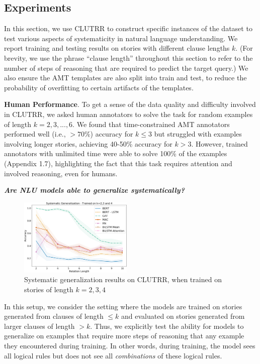 \documentclass[12pt]{article}
\newcommand{\xhdr}[1]{{\noindent\bfseries #1}.}
\newcommand{\xit}[1]{{\noindent\textbf{\textit{#1}}}}
\begin{document}
\subsection{Experiments}

In this section, we use CLUTRR to construct specific instances of the dataset to test various aspects of systematicity in natural language understanding.
We report training and testing results on stories with different clause lengths $k$.
(For brevity, we use the phrase ``clause length'' throughout this section to refer to the number of steps of reasoning that are required to predict the target query.)
We also ensure the AMT templates are also split into train and test, to reduce the probability of overfitting to certain artifacts of the templates.

\xhdr{Human Performance} To get a sense of the data quality and difficulty involved in CLUTRR, we asked human annotators to solve the task for random examples of length $k=2,3,...,6$.
We found that time-constrained AMT annotators performed well (i.e., ${>70\%}$) accuracy for ${k\leq 3}$ but struggled with examples involving longer stories, achieving 40-50\% accuracy for ${k > 3}$. However, trained annotators with unlimited time were able to solve 100\% of the examples (Appendix 1.7), highlighting the fact that this task requires attention and involved reasoning, even for humans.

\xit{Are NLU models able to generalize systematically?}

\begin{figure}
\begin{center}
  \includegraphics[width=0.48\textwidth]{images/clutrr_sys_gen_234.png}
\end{center}
\caption{Systematic generalization results on CLUTRR, when trained on stories of length $k=2,3,4$}
\label{fig:clutrr_sys_gen_234}
\end{figure}

In this setup, we consider the setting where the models are trained on stories generated from clauses of length ${\leq k}$ and evaluated on stories generated from larger clauses of length ${>k}$. Thus, we explicitly test the ability for models to generalize on examples that require more steps of reasoning that any example they encountered during training.
In other words, during training, the model sees all logical rules but does not see all {\em combinations} of these logical rules.
\end{document}
